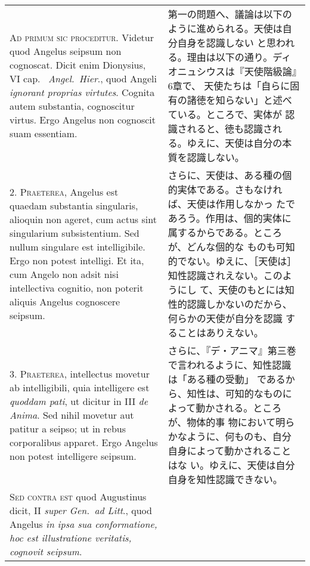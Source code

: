 \documentclass[10pt]{jsarticle} %
\begin{document}
\begin{longtable}{p{21em}p{21em}}


{\huge A}{\scshape d primum sic proceditur}. Videtur quod Angelus
seipsum non cognoscat. Dicit enim Dionysius, VI cap.~{\itshape
Angel.~Hier}., quod Angeli {\itshape ignorant proprias
virtutes}. Cognita autem substantia, cognoscitur virtus. Ergo Angelus
non cognoscit suam essentiam.

&

第一の問題へ、議論は以下のように進められる。天使は自分自身を認識しない
と思われる。理由は以下の通り。ディオニュシウスは『天使階級論』6章で、
天使たちは「自らに固有の諸徳を知らない」と述べている。ところで、実体が
認識されると、徳も認識される。ゆえに、天使は自分の本質を認識しない。

\\


2. {\scshape Praeterea}, Angelus est quaedam substantia singularis,
alioquin non ageret, cum actus sint singularium subsistentium. Sed
nullum singulare est intelligibile. Ergo non potest intelligi. Et ita,
cum Angelo non adsit nisi intellectiva cognitio, non poterit aliquis
Angelus cognoscere seipsum.


&

さらに、天使は、ある種の個的実体である。さもなければ、天使は作用しなかっ
たであろう。作用は、個的実体に属するからである。ところが、どんな個的な
ものも可知的でない。ゆえに、［天使は］知性認識されえない。このようにし
て、天使のもとには知性的認識しかないのだから、何らかの天使が自分を認識
することはありえない。

\\


3. {\scshape Praeterea}, intellectus movetur ab intelligibili, quia
intelligere est {\itshape quoddam pati}, ut dicitur in III {\itshape
de Anima}. Sed nihil movetur aut patitur a seipso; ut in rebus
corporalibus apparet. Ergo Angelus non potest intelligere seipsum.


&

さらに、『デ・アニマ』第三巻で言われるように、知性認識は「ある種の受動」
であるから、知性は、可知的なものによって動かされる。ところが、物体的事
物において明らかなように、何ものも、自分自身によって動かされることはな
い。ゆえに、天使は自分自身を知性認識できない。

\\


{\scshape Sed contra est} quod Augustinus dicit, II {\itshape super
Gen.~ad Litt}., quod Angelus {\itshape in ipsa sua conformatione, hoc
est illustratione veritatis, cognovit seipsum}.



\end{longtable}
\end{document}
